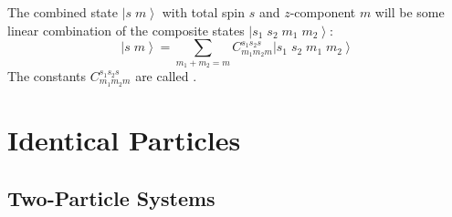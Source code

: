 \documentclass[12pt, a4paper, oneside, openright, titlepage]{book}
\newcommand{\ket}[1]{\left\vert#1\right\rangle}
\begin{document}
The combined state $\ket{s\;m}$ with total spin $s$ and $z$-component $m$ will be some linear combination of the composite states $\ket{s_1\;s_2\;m_1\;m_2}$: \begin{equation*}
    \ket{s\;m} = \sum_{m_1+m_2=m}C_{m_1m_2m}^{s_1s_2s}\ket{s_1\;s_2\;m_1\;m_2}
\end{equation*}
The constants $C_{m_1m_2m}^{s_1s_2s}$ are called . 










\chapter{Identical Particles}

\section{Two-Particle Systems}
\end{document}
